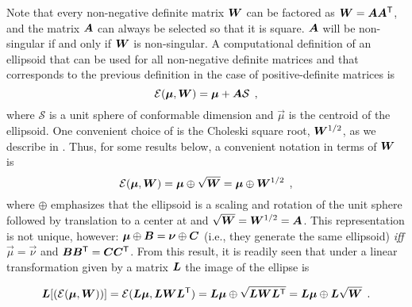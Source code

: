 Note that every non-negative definite matrix $\bm{W}$ can be factored as $\bm{W}=\bm{A}\bm{A}^\mathsf{T}$,
and the matrix $\bm{A}$ can always be selected so that it is square.
$\bm{A}$ will be non-singular if and only if $\bm{W}$ is non-singular.
A computational
definition of an ellipsoid that can be used for all non-negative definite matrices and that corresponds to the previous definition in the case of positive-definite matrices is
\begin{equation}\label{eq:ellAS}
\mathcal{E}(\bm{\mu},\bm{W}) = \bm{\mu} + \bm{A} \mathcal{S} \:\: ,
\end{equation}
where $\mathcal{S}$ is a unit sphere of conformable dimension and $\vec{\mu}$ is the centroid of the ellipsoid.
One convenient choice of  is the Choleski square root, $\bm{W}^{1/2}$, as we describe in .
Thus, for some results below, a convenient notation in terms of $\bm{W}$ is
\begin{equation}\label{eq:ellipsoidW}
\mathcal{E}(\bm{\mu}, \bm{W}) = \bm{\mu} \oplus \sqrt{\bm{W}} = \bm{\mu} \oplus \bm{W}^{1/2} \:\: ,
\end{equation}
where $\oplus$
emphasizes that the ellipsoid is a scaling and rotation of the unit sphere followed by translation to
a center at \vec{\mu} and $\sqrt{\bm{W}}=\bm{W}^{1/2}=\bm{A}$. This representation is not unique,
however:  $\bm{\mu} \oplus \bm{B} = \bm{\nu} \oplus \bm{C}$ (i.e., they generate the same ellipsoid)
\emph{iff} $\vec{\mu} = \vec{\nu}$ and $\bm{B}\bm{B}^\mathsf{T} = \bm{C}\bm{C}^\mathsf{T}$.
From this result, it is readily seen that under a linear transformation given by a matrix
$\bm{L}$
the image of the ellipse is

\begin{equation}\label{eq:Limage}
\bm{L} [ (\mathcal{E}(\bm{\mu} ,\bm{W})) ] = \mathcal{E}(\bm{L}\bm{\mu} ,\bm{L}\bm{W}{\bm{L}}^\mathsf{T})=\bm{L}\bm{\mu} \oplus \sqrt{\bm{L}\bm{W}{\bm{L}}^\mathsf{T}}=\bm{L}\bm{\mu} \oplus \bm{L}\sqrt{\bm{W}} \:\: .
\end{equation}

